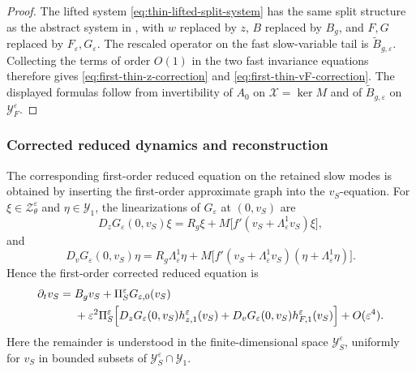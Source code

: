 \documentclass[11pt]{article}
\theoremstyle{definition}
\theoremstyle{remark}
\numberwithin{equation}{section}
\begin{document}
\begin{proof}
The lifted system \eqref{eq:thin-lifted-split-system} has the same split
structure as the abstract system in ,
with \(w\) replaced by \(z\), \(B\) replaced by \(B_g\), and
\(F,G\) replaced by \(F_\varepsilon,G_\varepsilon\). The rescaled operator on
the fast slow-variable tail is \(\widetilde B_{g,\varepsilon}\). Collecting the
terms of order \(O(1)\) in the two fast invariance equations therefore gives
\eqref{eq:first-thin-z-correction} and
\eqref{eq:first-thin-vF-correction}. The displayed formulas follow from
invertibility of \(A_0\) on \(\mathcal X=\ker M\) and of
\(\widetilde B_{g,\varepsilon}\) on \(\mathcal Y_F^\varepsilon\).
\end{proof}

\subsubsection*{Corrected reduced dynamics and reconstruction}

The corresponding first-order reduced equation on the retained slow modes is
obtained by inserting the first-order approximate graph into the \(v_S\)-equation. For
\(\xi\in\mathcal Z_\theta^\varepsilon\) and \(\eta\in\mathcal Y_1\), the
linearizations of \(G_\varepsilon\) at \((0,v_S)\) are
\[
D_zG_\varepsilon(0,v_S)\xi
=
R_g\xi
+
M\bigl[
f'(v_S+\Lambda_\varepsilon^1v_S)\xi
\bigr],
\]
and
\[
D_vG_\varepsilon(0,v_S)\eta
=
R_g\Lambda_\varepsilon^1\eta
+
M\bigl[
f'(v_S+\Lambda_\varepsilon^1v_S)
(\eta+\Lambda_\varepsilon^1\eta)
\bigr].
\]
Hence the first-order corrected reduced equation is
\begin{align}
\label{eq:thin-corrected-reduced-dynamics}
\partial_tv_S
={}&
B_gv_S
+
\Pi_S^\varepsilon G_{\varepsilon,0}(v_S)
\nonumber\\
&+
\varepsilon^2
\Pi_S^\varepsilon
\Bigl[
D_zG_\varepsilon(0,v_S)h_{z,1}^\varepsilon(v_S)
+
D_vG_\varepsilon(0,v_S)h_{F,1}^\varepsilon(v_S)
\Bigr]
+
O(\varepsilon^4).
\end{align}
Here the remainder is understood in the finite-dimensional space
\(\mathcal Y_S^\varepsilon\), uniformly for \(v_S\) in bounded subsets of
\(\mathcal Y_S^\varepsilon\cap\mathcal Y_1\).
\end{document}
